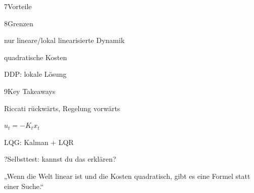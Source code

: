 \begin{hngrid}
\begin{hnp}[raster multicolumn=2,acc=hngreen]{7}{Vorteile}
\begin{hnpro}
\end{hnpro}
\end{hnp}
%
\begin{hnp}[raster multicolumn=2,acc=hnred]{8}{Grenzen}
\begin{hncon}
\item nur lineare/lokal linearisierte Dynamik
\item quadratische Kosten
\item DDP: lokale Lösung
\end{hncon}
\end{hnp}
%
\begin{hnp}[raster multicolumn=2,acc=hnorange]{9}{Key Takeaways}
\begin{hnchk}
\item Riccati rückwärts, Regelung vorwärts
\item $u_t=-K_tx_t$
\item LQG: Kalman + LQR
\end{hnchk}
\end{hnp}
%
\begin{hnp}[raster multicolumn=6,acc=hnpurple,colback=hnlilac!30]{?}{Selbsttest: kannst du das erklären?}
\end{hnp}
%
\begin{hnbanner}[raster multicolumn=6]
„Wenn die Welt linear ist und die Kosten quadratisch, gibt es eine Formel statt einer Suche.“
\end{hnbanner}
\end{hngrid}
